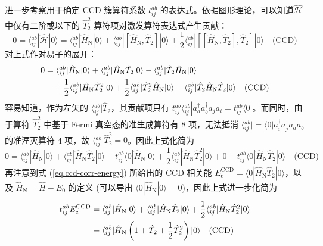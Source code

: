 进一步考察用于确定 CCD 簇算符系数 $t_{ij}^{ab}$ 的表达式。依据图形理论，可以知道$\hat{\mathcal{H}}$ 中仅有二阶或以下的 $\hat T_2^2$ 算符项对激发算符表达式产生贡献：
\begin{equation}
  \label{eq.ccd-amplitude-connect}
  0 = \langle {}_{ij}^{ab} | \hat{\mathcal{H}} | 0 \rangle = \langle {}_{ij}^{ab} | \hat H_\mathrm{N} | 0 \rangle + \langle {}_{ij}^{ab} | [\hat H_\mathrm{N}, \hat T_2] | 0 \rangle + \frac{1}{2} \langle {}_{ij}^{ab} | [[\hat H_\mathrm{N}, \hat T_2], \hat T_2] | 0 \rangle \quad \text{(CCD)}
\end{equation}
对上式作对易子的展开：
\begin{align}
  0 &= \langle {}_{ij}^{ab} | \hat H_\mathrm{N} | 0 \rangle + \langle {}_{ij}^{ab} | \hat H_\mathrm{N} \hat T_2 | 0 \rangle - \langle {}_{ij}^{ab} | \hat T_2 \hat H_\mathrm{N} | 0 \rangle \notag\\
  &\quad + \frac{1}{2} \langle {}_{ij}^{ab} | \hat H_\mathrm{N} \hat T_2^2 | 0 \rangle + \frac{1}{2} \langle {}_{ij}^{ab} | \hat T_2^2 \hat H_\mathrm{N} | 0 \rangle - \langle {}_{ij}^{ab} | \hat T_2 \hat H_\mathrm{N} \hat T_2 | 0 \rangle \quad \text{(CCD)}
\end{align}
容易知道，作为左矢的 $\langle {}_{ij}^{ab} | \hat T_2$，其贡献项只有 $t_{ij}^{ab} \langle {}_{ij}^{ab} | a_a^\dagger a_b^\dagger a_j a_i = t_{ij}^{ab} \langle 0 |$。而同时，由于算符 $\hat T_2^2$ 中基于 Fermi 真空态的准生成算符有 8 项，无法抵消 $\langle {}_{ij}^{ab} | = \langle 0 | a_i^\dagger a_j^\dagger a_a a_b$ 的准湮灭算符 4 项，故 $\langle {}_{ij}^{ab} | \hat T_2^2 = 0$。因此上式化简为
\begin{equation*}
  0 = \langle {}_{ij}^{ab} | \hat H_\mathrm{N} | 0 \rangle + \langle {}_{ij}^{ab} | \hat H_\mathrm{N} \hat T_2 | 0 \rangle - t_{ij}^{ab} \langle 0 | \hat H_\mathrm{N} | 0 \rangle + \frac{1}{2} \langle {}_{ij}^{ab} | \hat H_\mathrm{N} \hat T_2^2 | 0 \rangle + 0 - t_{ij}^{ab} \langle 0 | \hat H_\mathrm{N} \hat T_2 | 0 \rangle \quad \text{(CCD)}
\end{equation*}
再注意到式 (\ref{eq.ccd-corr-energy}) 所给出的 CCD 相关能 $E_\mathrm{c}^\mathrm{CCD} = \langle 0 | \hat H_\mathrm{N} \hat T_2 | 0 \rangle$，以及 $\hat H_\mathrm{N} = \hat H - E_0$ 的定义 (可以导出 $\langle 0 | \hat H_\mathrm{N} | 0 \rangle = 0$)，因此上式进一步化简为
\begin{align}
  \label{eq.ccd-amplitude}
  t_{ij}^{ab} E_\mathrm{c}^\mathrm{CCD} &= \langle {}_{ij}^{ab} | \hat H_\mathrm{N} | 0 \rangle + \langle {}_{ij}^{ab} | \hat H_\mathrm{N} \hat T_2 | 0 \rangle + \frac{1}{2} \langle {}_{ij}^{ab} | \hat H_\mathrm{N} \hat T_2^2 | 0 \rangle \notag\\
  &= \langle {}_{ij}^{ab} | \hat H_\mathrm{N} \left( 1 + \hat T_2 + \frac{1}{2} \hat T_2^2 \right) | 0 \rangle \quad \text{(CCD)}
\end{align}
